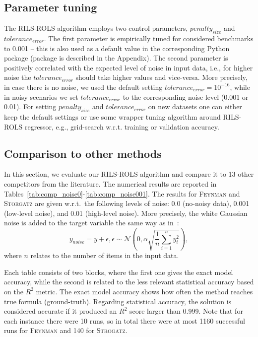 \documentclass{bmcart}
\begin{document}
\subsection{Parameter tuning}

The \textsc{RILS}-\textsc{ROLS} algorithm employs two control parameters, $penalty_{size}$ and $tolerance_{error}$. The first parameter is empirically tuned for considered benchmarks to 0.001 -- this is also used as a default value in the corresponding Python package (package is described in the Appendix). The second parameter is positively correlated with the expected level of noise in input data, i.e., for higher noise the $tolerance_{error}$ should take higher values and vice-versa. More precisely, in case there is no noise, we used the default setting $tolerance_{error}=10^{-16}$, while in noisy scenarios we set $tolerance_{error}$ to the corresponding noise level (0.001 or 0.01). 
For setting $penalty_{size}$ and $tolerance_{error}$ on new datasets one can either keep the default settings or use some wrapper tuning algorithm around \textsc{RILS-ROLS} regressor, e.g., grid-search w.r.t. training or validation accuracy. 

\subsection{Comparison to other methods}
In this section, we evaluate our \textsc{RILS-ROLS} algorithm and compare it to 13 other competitors from the literature. The numerical results are reported in Tables~\ref{tab:comp_noise0}-\ref{tab:comp_noise001}. The results for \textsc{Feynman} and \textsc{Storgatz} are given w.r.t.\  the following levels of noise: 0.0 (no-noisy data), 0.001 (low-level noise), and 0.01 (high-level noise). More precisely, the white Gaussian noise is added to the target variable the same way as in~\cite{la2021contemporary}:
$$ y_{noise} = y + \epsilon, \epsilon \sim \mathcal{N}\left(0, \alpha \sqrt{\frac{1}{n} \sum _{i=1}^n{y_i^2}}\right),$$
where $n$ relates to the number of items in the input data.

Each table consists of two blocks, where the first one gives the exact model accuracy, while the second is related to the less relevant statistical accuracy based on the $R^2$ metric. The exact model accuracy shows how often the method reaches true formula (ground-truth). Regarding statistical accuracy, the solution is considered accurate if it produced an $R^2$ score larger than 0.999.  Note that for each instance there were 10 runs, so in total there were at most 1160 successful runs for \textsc{Feynman} and 140 for \textsc{Strogatz}.  
\end{document}
